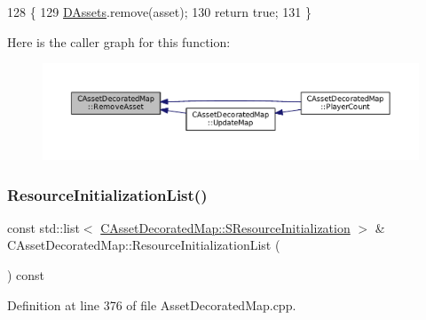 \begin{DoxyCode}
128                                                                        \{
129     \hyperlink{classCAssetDecoratedMap_a94eeed5b16141169b1ba6cb3842055aa}{DAssets}.remove(asset);
130     \textcolor{keywordflow}{return} \textcolor{keyword}{true};    
131 \}
\end{DoxyCode}
Here is the caller graph for this function\+:
\nopagebreak
\begin{figure}[H]
\begin{center}
\leavevmode
\includegraphics[width=350pt]{classCAssetDecoratedMap_a77f46be1ceb30bb83fc3f35c0d58a9a7_icgraph}
\end{center}
\end{figure}
\hypertarget{classCAssetDecoratedMap_a279fb55e5536131b599275e8629d51cd}{}\label{classCAssetDecoratedMap_a279fb55e5536131b599275e8629d51cd} 
\subsubsection{\texorpdfstring{Resource\+Initialization\+List()}{ResourceInitializationList()}}
{\footnotesize\ttfamily const std\+::list$<$ \hyperlink{structCAssetDecoratedMap_1_1SResourceInitialization}{C\+Asset\+Decorated\+Map\+::\+S\+Resource\+Initialization} $>$ \& C\+Asset\+Decorated\+Map\+::\+Resource\+Initialization\+List (\begin{DoxyParamCaption}{ }\end{DoxyParamCaption}) const}



Definition at line 376 of file Asset\+Decorated\+Map.\+cpp.


